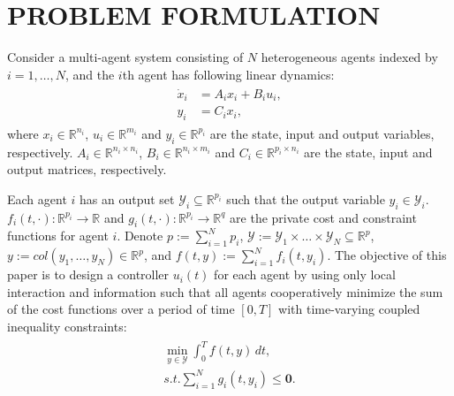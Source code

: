 \documentclass[letterpaper, 10 pt, conference]{ieeeconf}  %
\newtheorem{lemma}{ {Lemma}}
\begin{document}


\section{PROBLEM FORMULATION}\label{pro}

Consider a multi-agent system consisting of $N$ heterogeneous agents indexed by $i=1, \dots, N$, and the $i$th agent has following linear dynamics:
\begin{align} 
	\begin{split}
		{\dot x}_i&=A_i x_i + B_i u_i,\\
		y_i&=C_i x_i,\label{eqsys}
	\end{split}
\end{align}
where $x_i\in\mathbb{R}^{n_i}$, $u_i\in\mathbb{R}^{m_i}$ and $y_i\in\mathbb{R}^{p_i}$ are the state, input and output variables, respectively. $A_i\in\mathbb{R}^{n_i \times n_i}$, $B_i\in\mathbb{R}^{n_i \times m_i}$ and $C_i\in\mathbb{R}^{p_i \times n_i}$ are the state, input and output matrices, respectively.

Each agent $i$ has an output set $\mathcal{Y}_i\subseteq\mathbb{R}^{p_i}$ such that the output variable $y_i\in\mathcal{Y}_i$. $f_i(t,\cdot): \mathbb{R}^{p_i}\to \mathbb{R}$ and $g_i(t,\cdot): \mathbb{R}^{p_i}\to \mathbb{R}^{q}$ are the private cost and constraint functions for agent $i$.
Denote $p:=\sum_{i=1}^{N}p_i$, $\mathcal{Y}:=\mathcal{Y}_1\times\dots \times \mathcal{Y}_N \subseteq \mathbb{R}^{p}$, $y:=col(y_1,\dots, y_N)\in\mathbb{R}^p$, and $f(t,y):=\sum_{i=1}^{N}f_{i}(t, y_i)$.
The objective of this paper is to design a controller $u_i(t)$ for each agent by using only local interaction and information such that all agents cooperatively minimize the sum of the cost functions over a period of time $[0,T]$ with time-varying coupled inequality constraints: 
\begin{align}
	\begin{split}
		\min_{y \in \mathcal{Y}} \int_{0}^{T}f(t,y)\,dt ,\\
		s.t. \sum_{i=1}^{N}g_{i}(t, y_i)\le \boldsymbol0.\label{question2}
	\end{split}
\end{align}
\end{document}
